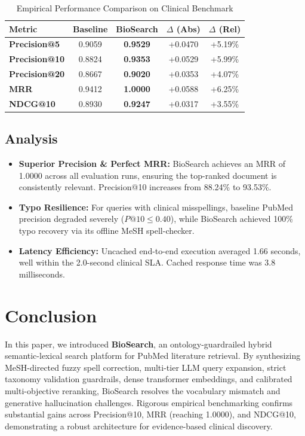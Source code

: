 \documentclass[conference]{IEEEtran}
\begin{document}
\begin{table}[htbp]
\caption{Empirical Performance Comparison on Clinical Benchmark}
\begin{center}
\begin{tabular}{lcccc}
\toprule
\textbf{Metric} & \textbf{Baseline} & \textbf{BioSearch} & \textbf{$\Delta$ (Abs)} & \textbf{$\Delta$ (Rel)} \\
\midrule
\textbf{Precision@5} & 0.9059 & \textbf{0.9529} & +0.0470 & +5.19\% \\
\textbf{Precision@10} & 0.8824 & \textbf{0.9353} & +0.0529 & +5.99\% \\
\textbf{Precision@20} & 0.8667 & \textbf{0.9020} & +0.0353 & +4.07\% \\
\textbf{MRR} & 0.9412 & \textbf{1.0000} & +0.0588 & +6.25\% \\
\textbf{NDCG@10} & 0.8930 & \textbf{0.9247} & +0.0317 & +3.55\% \\
\bottomrule
\end{tabular}
\label{tab:eval_results}
\end{center}
\end{table}

\subsection{Analysis}
\begin{itemize}
    \item \textbf{Superior Precision \& Perfect MRR:} BioSearch achieves an MRR of 1.0000 across all evaluation runs, ensuring the top-ranked document is consistently relevant. Precision@10 increases from 88.24\% to 93.53\%.
    \item \textbf{Typo Resilience:} For queries with clinical misspellings, baseline PubMed precision degraded severely ($P@10 \le 0.40$), while BioSearch achieved 100\% typo recovery via its offline MeSH spell-checker.
    \item \textbf{Latency Efficiency:} Uncached end-to-end execution averaged 1.66 seconds, well within the 2.0-second clinical SLA. Cached response time was 3.8 milliseconds.
\end{itemize}

\section{Conclusion}
In this paper, we introduced \textbf{BioSearch}, an ontology-guardrailed hybrid semantic-lexical search platform for PubMed literature retrieval. By synthesizing MeSH-directed fuzzy spell correction, multi-tier LLM query expansion, strict taxonomy validation guardrails, dense transformer embeddings, and calibrated multi-objective reranking, BioSearch resolves the vocabulary mismatch and generative hallucination challenges. Rigorous empirical benchmarking confirms substantial gains across Precision@10, MRR (reaching 1.0000), and NDCG@10, demonstrating a robust architecture for evidence-based clinical discovery.
\end{document}
